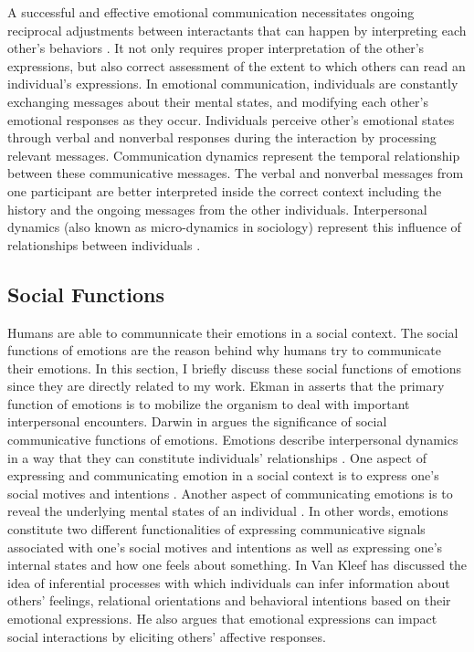 \documentclass[11pt]{article}
\begin{document}
A successful and effective emotional communication necessitates ongoing
reciprocal adjustments between interactants that can happen by interpreting each
other's behaviors \cite{parkinson:emotion-social-interaction}. It not only
requires proper interpretation of the other's expressions, but also correct
assessment of the extent to which others can read an individual's expressions.
In emotional communication, individuals are constantly exchanging messages about
their mental states, and modifying each other's emotional responses as they
occur. Individuals perceive other's emotional states through verbal and
nonverbal responses during the interaction by processing relevant messages.
Communication dynamics represent the temporal relationship between these
communicative messages. The verbal and nonverbal messages from one participant
are better interpreted inside the correct context including the history and the
ongoing messages from the other individuals. Interpersonal dynamics (also known
as micro-dynamics in sociology) represent this influence of relationships
between individuals \cite{louis:communication-dynamic}.

\subsection{Social Functions}

Humans are able to communnicate their emotions in a social context. The social
functions of emotions are the reason behind why humans try to communicate their
emotions. In this section, I briefly discuss these social functions of emotions
since they are directly related to my work. Ekman in
\cite{ekman:argument-emotions} asserts that the primary function of emotions is
to mobilize the organism to deal with important interpersonal encounters. Darwin
in \cite{darwin:emotion-expression} argues the significance of social
communicative functions of emotions. Emotions describe interpersonal dynamics in
a way that they can constitute individuals' relationships
\cite{parkinson:emotions-social, tiedens:social-life}. One aspect of expressing
and communicating emotion in a social context is to express one's social motives
and intentions \cite{hess:darwin-emotion}. Another aspect of communicating
emotions is to reveal the underlying mental states of an individual
\cite{parkinson:emotion-communication}. In other words, emotions constitute two
different functionalities of expressing communicative signals associated with
one's social motives and intentions as well as expressing one's internal states
and how one feels about something. In \cite{kleef:emotion-regulate-social} Van
Kleef has discussed the idea of inferential processes with which individuals can
infer information about others' feelings, relational orientations and behavioral
intentions based on their emotional expressions. He also argues that emotional
expressions can impact social interactions by eliciting others' affective
responses.
\end{document}

